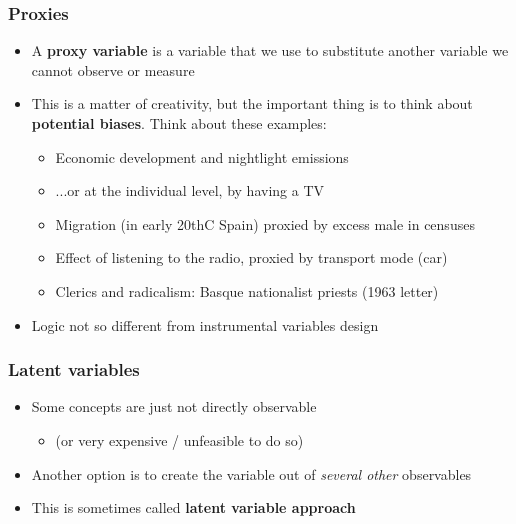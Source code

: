 \documentclass[aspectratio=43]{beamer}
\begin{document}
\begin{frame}
\frametitle{Proxies}
\centering

\begin{itemize}
  \item A \textbf{proxy variable} is a variable that we use to substitute another variable we cannot observe or measure
  \item This is a matter of creativity, but the important thing is to think about \textbf{potential biases}. Think about these examples:
  \begin{itemize}
    \item<2-> Economic development and nightlight emissions
    \item<3-> ...or at the individual level, by having a TV
    \item<4-> Migration (in early 20thC Spain) proxied by excess male in censuses
    \item<5-> Effect of listening to the radio, proxied by transport mode (car)
    \item<6-> Clerics and radicalism: Basque nationalist priests (1963 letter)
  \end{itemize}
  \item<7-> Logic not so different from instrumental variables design
\end{itemize}

\end{frame}

\begin{frame}
\frametitle{Latent variables}
\centering

\begin{itemize}
  \item Some concepts are just not directly observable
  \begin{itemize}
    \item (or very expensive / unfeasible to do so)
  \end{itemize}
  \item Another option is to create the variable out of \textit{several other} observables
  \item This is sometimes called \textbf{latent variable approach}
\end{itemize}

\end{frame}
\end{document}
